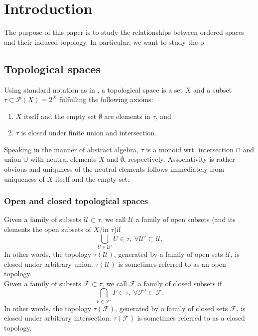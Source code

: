 \section{Introduction}
The purpose of this paper is to study the relationships between ordered spaces and their induced topology. In particular, we want to study the p
\subsection{Topological spaces}
Using standard notation as in \cite{Bour04}, a topological space is a set $X$ and a subset $\tau \subset \mathcal{P}(X) = 2^X$ fulfulling the following axioms:
\begin{enumerate}
\item $X$ itself and the empty set $\emptyset$ are elements in $\tau$, and
\item $\tau$ is closed under finite union and intersection.
\end{enumerate}
Speaking in the manner of abstract algebra, $\tau$ is a monoid wrt. intersection $\cap$ and union $\cup$ with neutral elements $X$ and $\emptyset$, respectively. Associativity is rather obvious and uniquness of the neutral elements follows immediately from uniqueness of $X$ itself and the empty set.
\subsubsection{Open and closed topological spaces}
Given a family of subsets $\mathcal{U} \subset \tau$, we call $\mathcal{U}$ a family of open subsets (and its elements the open subsets of $X$/in $\tau$)if
$$\bigcup_{U \in \mathcal{U}'} U \in \tau,\ \forall \mathcal{U}' \subset \mathcal{U}.$$
In other words, the topology $\tau(\mathcal{U})$, generated by a family of open sets $\mathcal{U}$, is closed under arbitrary union. $\tau(\mathcal{U})$ is sometimes referred to as an open topology.\\
\indent Given a family of subsets $\mathcal{F} \subset \tau$, we call $\mathcal{F}$ a family of closed subsets
if
$$\bigcap_{F \in \mathcal{F}'} F \in \tau,\ \forall \mathcal{F}' \subset \mathcal{F}.$$
In other words, the topology $\tau(\mathcal{F})$, generated by a family of closed sets $\mathcal{F}$, is closed under arbitrary intersection. $\tau(\mathcal{F})$ is sometimes referred to as a closed topology.\\
